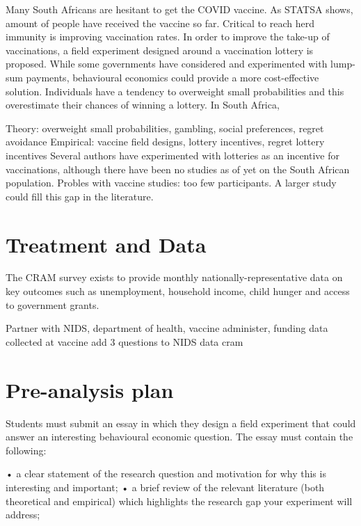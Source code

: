 \documentclass[11pt,preprint, authoryear]{elsarticle}
\numberwithin{equation}{section}
\numberwithin{figure}{section}
\numberwithin{table}{section}
\begin{document}
Many South Africans are hesitant to get the COVID vaccine. As STATSA
shows, amount of people have received the vaccine so far. Critical to
reach herd immunity is improving vaccination rates. In order to improve
the take-up of vaccinations, a field experiment designed around a
vaccination lottery is proposed. While some governments have considered
and experimented with lump-sum payments, behavioural economics could
provide a more cost-effective solution. Individuals have a tendency to
overweight small probabilities and this overestimate their chances of
winning a lottery. In South Africa,

Theory: overweight small probabilities, gambling, social preferences,
regret avoidance Empirical: vaccine field designs, lottery incentives,
regret lottery incentives Several authors have experimented with
lotteries as an incentive for vaccinations, although there have been no
studies as of yet on the South African population. Probles with vaccine
studies: too few participants. A larger study could fill this gap in the
literature.

\hypertarget{treatment-and-data}{%
\section{\texorpdfstring{Treatment and Data
\label{treat}}{Treatment and Data }}\label{treatment-and-data}}

The CRAM survey exists to provide monthly nationally-representative data
on key outcomes such as unemployment, household income, child hunger and
access to government grants.

Partner with NIDS, department of health, vaccine administer, funding
data collected at vaccine add 3 questions to NIDS data cram

\hypertarget{pre-analysis-plan}{%
\section{\texorpdfstring{Pre-analysis plan
\label{pre}}{Pre-analysis plan }}\label{pre-analysis-plan}}

Students must submit an essay in which they design a field experiment
that could answer an interesting behavioural economic question. The
essay must contain the following:

• a clear statement of the research question and motivation for why this
is interesting and important; • a brief review of the relevant
literature (both theoretical and empirical) which highlights the
research gap your experiment will address;
\end{document}
